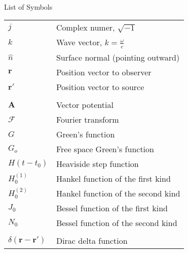 \renewcommand{\baselinestretch}{1}
\small\normalsize
\hbox{\ }

\vspace{-4em}

\begin{center}
\large{List of Symbols}
\end{center} 

\vspace{3pt}

\begin{supertabular}{ll}
$j$ & Complex numer, $\sqrt{-1}$ \\
$k$ & Wave vector, $k = \frac{\omega}{c}$ \\
$\hat{n}$ & Surface normal (pointing outward) \\
$\mathbf{r}$ & Position vector to observer \\
$\mathbf{r}'$ & Position vector to source \\
\\
$\mathbf{A}$ & Vector potential \\
$\mathcal{F}$ & Fourier transform \\
$G$ & Green's function \\
$G_o$ & Free space Green's function \\
$H(t-t_0)$ & Heaviside step function \\
$H_0^{(1)}$ & Hankel function of the first kind \\
$H_0^{(2)}$ & Hankel function of the second kind \\
$J_0$ & Bessel function of the first kind \\
$N_0$ & Bessel function of the second kind \\
\\
$\delta\left(\mathbf{r}-\mathbf{r}' \right)$ & Dirac delta function \\

\end{supertabular}